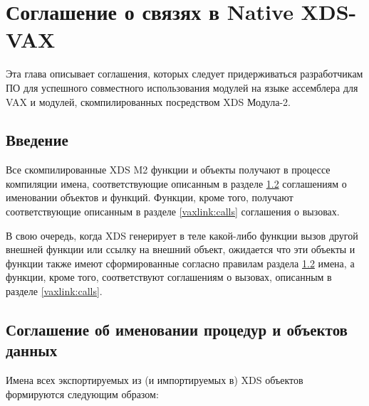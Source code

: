 \chapter{Соглашение о связях в Native XDS-VAX}
\label{vaxlink}

Эта глава описывает соглашения, которых следует придерживаться
разработчикам ПО для успешного совместного использования модулей на языке 
ассемблера для VAX и модулей, скомпилированных посредством XDS Модула-2.

\section{Введение}
\label{vaxlink:intro}

Все скомпилированные XDS M2 функции и объекты получают в процессе компиляции
имена, соответствующие описанным в разделе \ref{vaxlink:names} соглашениям 
о именовании объектов и функций. Функции, кроме того, получают соответствующие 
описанным в разделе \ref{vaxlink:calls} соглашения о вызовах.

В свою очередь, когда XDS генерирует в теле какой-либо функции вызов другой
внешней функции или ссылку на внешний объект, ожидается что эти объекты и
функции также имеют сформированные согласно правилам раздела \ref{vaxlink:names}
имена, а функции, кроме того, соответствуют соглашениям о вызовах, описанным в 
разделе \ref{vaxlink:calls}.

\section{Соглашение об именовании процедур и объектов данных}
\label{vaxlink:names}


Имена всех экспортируемых из (и импортируемых в) XDS объектов формируются
следующим образом:

